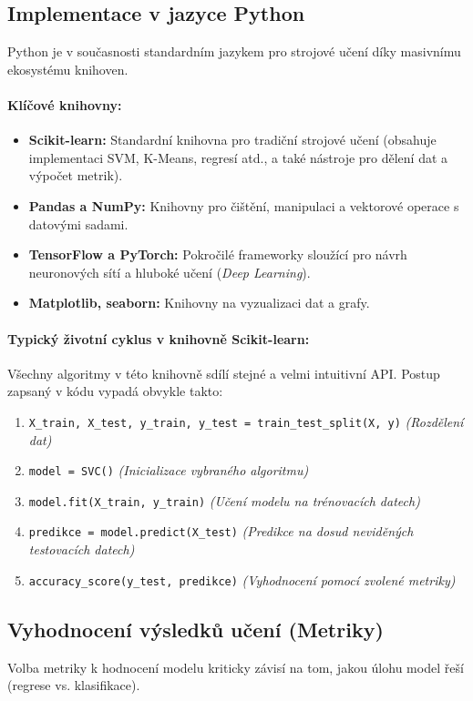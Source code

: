 \subsection{Implementace v jazyce Python}
Python je v současnosti standardním jazykem pro strojové učení díky masivnímu ekosystému knihoven.

\paragraph*{Klíčové knihovny:}
\begin{itemize}
    \item \textbf{Scikit-learn:} Standardní knihovna pro tradiční strojové učení (obsahuje implementaci SVM, K-Means, regresí atd., a také nástroje pro dělení dat a výpočet metrik).
    \item \textbf{Pandas a NumPy:} Knihovny pro čištění, manipulaci a vektorové operace s datovými sadami.
    \item \textbf{TensorFlow a PyTorch:} Pokročilé frameworky sloužící pro návrh neuronových sítí a hluboké učení (\textit{Deep Learning}).
    \item \textbf{Matplotlib, seaborn:} Knihovny na vyzualizaci dat a grafy.
\end{itemize}

\paragraph*{Typický životní cyklus v knihovně Scikit-learn:}
Všechny algoritmy v této knihovně sdílí stejné a velmi intuitivní API. Postup zapsaný v kódu vypadá obvykle takto:
\begin{enumerate}
    \item \texttt{X\_train, X\_test, y\_train, y\_test = train\_test\_split(X, y)} \textit{(Rozdělení dat)}
    \item \texttt{model = SVC()} \textit{(Inicializace vybraného algoritmu)}
    \item \texttt{model.fit(X\_train, y\_train)} \textit{(Učení modelu na trénovacích datech)}
    \item \texttt{predikce = model.predict(X\_test)} \textit{(Predikce na dosud neviděných testovacích datech)}
    \item \texttt{accuracy\_score(y\_test, predikce)} \textit{(Vyhodnocení pomocí zvolené metriky)}
\end{enumerate}

\subsection{Vyhodnocení výsledků učení (Metriky)}
Volba metriky k hodnocení modelu kriticky závisí na tom, jakou úlohu model řeší (regrese vs. klasifikace).

